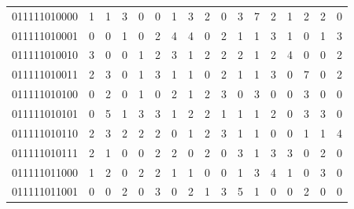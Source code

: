 \documentclass[10pt,a4paper]{article}
\begin{document}
\begin{longtable}{ |c|c|c|c|c|c|c|c|c|c|c|c|c|c|c|c|c| }
    011111010000              & 1                            & 1                                & 3                            & 0                              & 0   & 1   & 3   & 2   & 0   & 3   & 7   & 2   & 1   & 2   & 2   & 0   \\
    011111010001              & 0                            & 0                                & 1                            & 0                              & 2   & 4   & 4   & 0   & 2   & 1   & 1   & 3   & 1   & 0   & 1   & 3   \\
    011111010010              & 3                            & 0                                & 0                            & 1                              & 2   & 3   & 1   & 2   & 2   & 2   & 1   & 2   & 4   & 0   & 0   & 2   \\
    011111010011              & 2                            & 3                                & 0                            & 1                              & 3   & 1   & 1   & 0   & 2   & 1   & 1   & 3   & 0   & 7   & 0   & 2   \\
    011111010100              & 0                            & 2                                & 0                            & 1                              & 0   & 2   & 1   & 2   & 3   & 0   & 3   & 0   & 0   & 3   & 0   & 0   \\
    011111010101              & 0                            & 5                                & 1                            & 3                              & 3   & 1   & 2   & 2   & 1   & 1   & 1   & 2   & 0   & 3   & 3   & 0   \\
    011111010110              & 2                            & 3                                & 2                            & 2                              & 2   & 0   & 1   & 2   & 3   & 1   & 1   & 0   & 0   & 1   & 1   & 4   \\
    011111010111              & 2                            & 1                                & 0                            & 0                              & 2   & 2   & 0   & 2   & 0   & 3   & 1   & 3   & 3   & 0   & 2   & 0   \\
    011111011000              & 1                            & 2                                & 0                            & 2                              & 2   & 1   & 1   & 0   & 0   & 1   & 3   & 4   & 1   & 0   & 3   & 0   \\
    011111011001              & 0                            & 0                                & 2                            & 0                              & 3   & 0   & 2   & 1   & 3   & 5   & 1   & 0   & 0   & 2   & 0   & 0   \\

\end{longtable}
\end{document}
